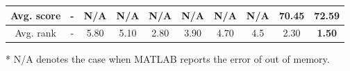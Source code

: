 \documentclass[a4paper,fleqn]{cas-dc}
\begin{document}
\begin{table*}[]
{\begin{threeparttable}
\begin{tabular}{@{}c||c||ccccccc|c@{}}
      \midrule
      \midrule
      Avg. score       & \multicolumn{1}{c}{-} & N/A                & N/A                 & N/A                         & N/A                 & N/A                 & N/A                 & 70.45               & \textbf{72.5}9\\
      \midrule
      \midrule
      Avg. rank        & \multicolumn{1}{c}{-} & 5.80               & 5.10                & 2.80                        & 3.90                & 4.70                & 4.5                 & 2.30                & \textbf{1.50}\\
      \bottomrule
    \end{tabular}\begin{tablenotes}
      \item[*] N/A denotes the case when MATLAB reports the error of out of memory.
    \end{tablenotes}    
    \end{threeparttable}
  }
    
\end{table*}
\end{document}
